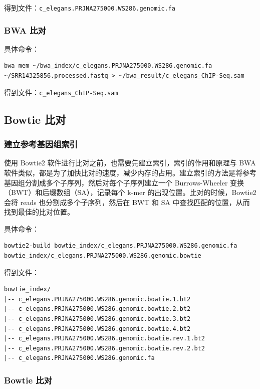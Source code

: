 \documentclass[UTF8]{ctexart}
\begin{document}
得到文件：\verb|c_elegans.PRJNA275000.WS286.genomic.fa|

\subsubsection{BWA 比对}

具体命令：

\begin{lstlisting}
bwa mem ~/bwa_index/c_elegans.PRJNA275000.WS286.genomic.fa ~/SRR14325856.processed.fastq > ~/bwa_result/c_elegans_ChIP-Seq.sam
\end{lstlisting}

得到文件：\verb|c_elegans_ChIP-Seq.sam|

\subsection{Bowtie 比对}

\subsubsection{建立参考基因组索引}

使用 Bowtie2 软件进行比对之前，也需要先建立索引，索引的作用和原理与 BWA 软件类似，都是为了加快比对的速度，减少内存的占用。建立索引的方法是将参考基因组分割成多个子序列，然后对每个子序列建立一个 Burrows-Wheeler 变换（BWT）和后缀数组（SA），记录每个 k-mer 的出现位置。比对的时候，Bowtie2 会将 reads 也分割成多个子序列，然后在 BWT 和 SA 中查找匹配的位置，从而找到最佳的比对位置。

具体命令：

\begin{lstlisting}
bowtie2-build bowtie_index/c_elegans.PRJNA275000.WS286.genomic.fa bowtie_index/c_elegans.PRJNA275000.WS286.genomic.bowtie
\end{lstlisting}

得到文件：

\begin{lstlisting}
bowtie_index/
|-- c_elegans.PRJNA275000.WS286.genomic.bowtie.1.bt2
|-- c_elegans.PRJNA275000.WS286.genomic.bowtie.2.bt2
|-- c_elegans.PRJNA275000.WS286.genomic.bowtie.3.bt2
|-- c_elegans.PRJNA275000.WS286.genomic.bowtie.4.bt2
|-- c_elegans.PRJNA275000.WS286.genomic.bowtie.rev.1.bt2
|-- c_elegans.PRJNA275000.WS286.genomic.bowtie.rev.2.bt2
|-- c_elegans.PRJNA275000.WS286.genomic.fa
\end{lstlisting}

\subsubsection{Bowtie 比对}
\end{document}
